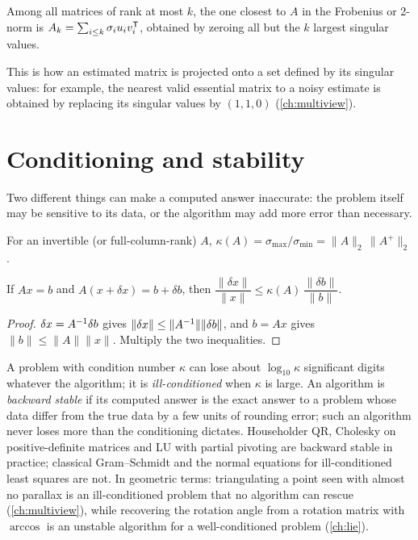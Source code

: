 \begin{theorem}
Among all matrices of rank at most $k$, the one closest to $A$ in the Frobenius or 2-norm is $A_k = \sum_{i\le k}\sigma_iu_iv_i^{\mathsf{T}}$, obtained by
zeroing all but the $k$ largest singular values.
\end{theorem}

This is how an estimated matrix is projected onto a set defined by its singular values: for example, the nearest valid essential matrix to a
noisy estimate is obtained by replacing its singular values by $(1, 1, 0)$ (\cref{ch:multiview}).

\section{Conditioning and stability}
\label{sec:conditioning}

Two different things can make a computed answer inaccurate: the problem itself may be sensitive to its data, or the algorithm may add more
error than necessary.

\begin{definition}
For an invertible (or full-column-rank) $A$, $\kappa(A) = \sigma_{\max}/\sigma_{\min} = \|A\|_2\,\|A^+\|_2$.
\end{definition}

\begin{proposition}
If $Ax = b$ and $A(x + \delta x) = b + \delta b$, then $\dfrac{\|\delta x\|}{\|x\|} \le \kappa(A)\,\dfrac{\|\delta b\|}{\|b\|}$.
\end{proposition}
\begin{proof}
$\delta x = A^{-1}\delta b$ gives $\|\delta x\| \le \|A^{-1}\|\|\delta b\|$, and $b = Ax$ gives $\|b\| \le \|A\|\|x\|$. Multiply the two
inequalities.
\end{proof}

A problem with condition number $\kappa$ can lose about $\log_{10}\kappa$ significant digits whatever the algorithm; it is
\emph{ill-conditioned} when $\kappa$ is large. An algorithm is \emph{backward stable} if its computed answer is the exact answer to a
problem whose data differ from the true data by a few units of rounding error; such an algorithm never loses more than the
conditioning dictates. Householder QR, Cholesky on positive-definite matrices and LU with partial pivoting are backward stable in
practice; classical Gram--Schmidt and the normal equations for ill-conditioned least squares are not. In geometric terms:
triangulating a point seen with almost no parallax is an ill-conditioned problem that no algorithm can rescue
(\cref{ch:multiview}), while recovering the rotation angle from a rotation matrix with $\arccos$ is an unstable algorithm for a
well-conditioned problem (\cref{ch:lie}).

